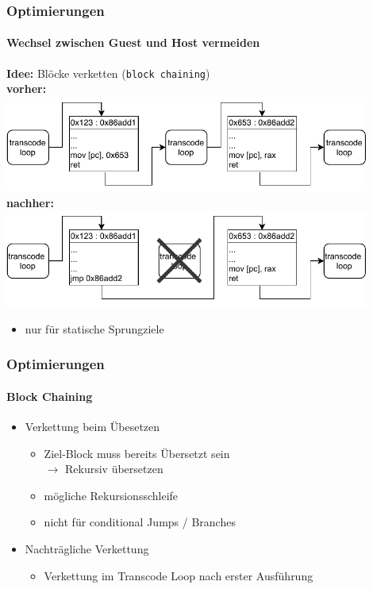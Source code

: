 \begin{frame}
	\begin{minipage}[t]{.75\textwidth}
		\frametitle{Optimierungen}
		\framesubtitle{Wechsel zwischen Guest und Host vermeiden}
		\textbf{Idee:} Blöcke verketten (\texttt{\footnotesize block chaining})\\
		\pause
		\textbf{vorher:}\\
		\includegraphics[width=0.9\textwidth]{diagrams/chaining-unchained.pdf}\\
		\pause
		\textbf{nachher:}\\
		\includegraphics[width=0.9\textwidth]{diagrams/chaining-chained.pdf}
	\end{minipage}
	\pause
	\begin{minipage}[t]{.2\textwidth}
		\vspace{3cm}
		\begin{itemize}
			\item nur für statische Sprungziele
		\end{itemize}
	\end{minipage}
	
\end{frame}
	
\begin{frame}
	\frametitle{Optimierungen}
	\framesubtitle{Block Chaining}
	\begin{itemize}
		\item Verkettung beim Übesetzen
		\pause
		\begin{itemize}
			\item Ziel-Block muss bereits Übersetzt sein\\
			\pause
			$\rightarrow$ Rekursiv übersetzen
			\pause
			\item mögliche Rekursionsschleife
			\pause
			\item nicht für conditional Jumps / Branches
		\end{itemize}
		\pause
		\item Nachträgliche Verkettung
		\begin{itemize}
			\pause
			\item Verkettung im Transcode Loop nach erster Ausführung
		\end{itemize}
	\end{itemize}
	
\end{frame}

